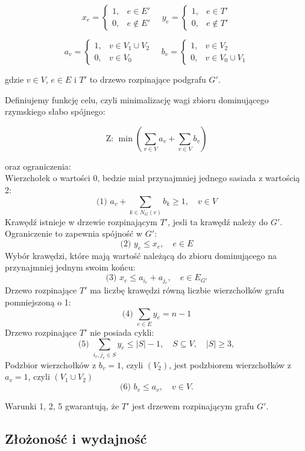 \[
x_e =
\begin{cases}
1, & e \in E' \\
0, & e \notin E'
\end{cases}
\quad
y_e =
\begin{cases}
1, & e \in T' \\
0, & e \notin T'
\end{cases}
\]

\[
a_v =
\begin{cases}
1, & v \in V_1 \cup V_2 \\
0, & v \in V_0
\end{cases}
\quad
b_v =
\begin{cases}
1, & v \in V_2 \\
0, & v \in V_0 \cup V_1
\end{cases}
\]

gdzie \( v \in V \), \( e \in E \) i \( T' \) to drzewo rozpinające podgrafu \( G' \).

Definiujemy funkcję celu, czyli minimalizację wagi zbioru dominującego rzymskiego słabo spójnego:

\[
\text{Z: } \min \left( \sum_{v \in V} a_v + \sum_{v \in V} b_v \right)
\]

oraz ograniczenia:\\
Wierzchołek o wartości 0, bedzie miał przynajmniej jednego sasiada z wartością 2:
\[
    \text{(1) } a_v + \sum_{k \in N_G(v)} b_k \geq 1, \quad v \in V 
\]
Krawędź istnieje w drzewie rozpinającym \( T' \), jesli ta krawędź należy do \( G' \). Ograniczenie to zapewnia spójność w \( G' \):
\[
    \text{(2) } y_e \leq x_e, \quad e \in E
\]
Wybór krawędzi, które mają  wartość należącą do zbioru dominującego na przynajmniej jednym swoim końcu:
\[
    \text{(3) } x_e \leq a_{i_e} + a_{j_e}, \quad e \in E_{G'} 
\]
Drzewo rozpinające \( T' \) ma liczbę krawędzi równą liczbie wierzchołków grafu pomniejszoną o 1:
\[
    \text{(4) } \sum_{e \in E} y_e = n - 1 
\]
Drzewo rozpinające \( T' \) nie posiada cykli:
\[
    \text{(5) } \sum_{i_e, j_e \in S} y_e \leq |S| - 1, \quad S \subseteq V, \quad |S| \geq 3, 
\]
Podzbior wierzchołków z $b_v = 1$, czyli $(V_2)$, jest podzbiorem wierzchołków z $a_v = 1$, czyli $(V_1 \cup V_2)$
\[
    \text{(6) } b_v \leq a_v, \quad v \in V. 
\]

Warunki 1, 2, 5 gwarantują, że \( T' \) jest drzewem rozpinającym grafu \( G' \).

\subsection{Złożoność i wydajność}

